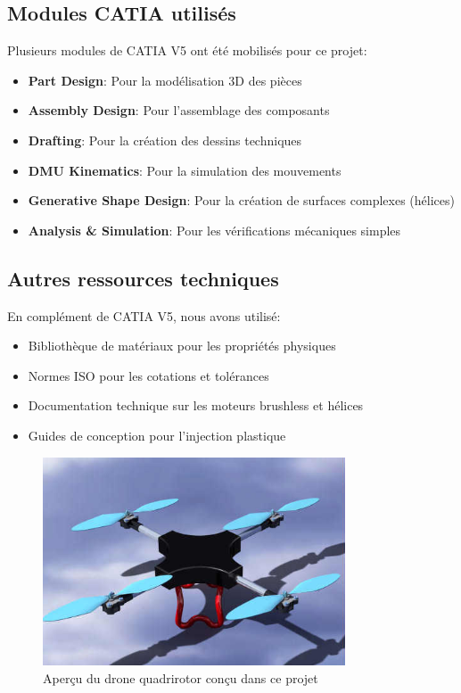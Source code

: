 \documentclass[a4paper,12pt]{report}
\begin{document}
\subsection{Modules CATIA utilisés}
Plusieurs modules de CATIA V5 ont été mobilisés pour ce projet:
\begin{itemize}
    \item \textbf{Part Design}: Pour la modélisation 3D des pièces
    \item \textbf{Assembly Design}: Pour l'assemblage des composants
    \item \textbf{Drafting}: Pour la création des dessins techniques
    \item \textbf{DMU Kinematics}: Pour la simulation des mouvements
    \item \textbf{Generative Shape Design}: Pour la création de surfaces complexes (hélices)
    \item \textbf{Analysis \& Simulation}: Pour les vérifications mécaniques simples
\end{itemize}

\subsection{Autres ressources techniques}
En complément de CATIA V5, nous avons utilisé:
\begin{itemize}
    \item Bibliothèque de matériaux pour les propriétés physiques
    \item Normes ISO pour les cotations et tolérances
    \item Documentation technique sur les moteurs brushless et hélices
    \item Guides de conception pour l'injection plastique
\end{itemize}

\begin{figure}[H]
    \centering
    \includegraphics[width=0.8\textwidth]{images/drone_apercu.png}
    \caption{Aperçu du drone quadrirotor conçu dans ce projet}
    \label{fig:drone_apercu}
\end{figure}
\end{document}
